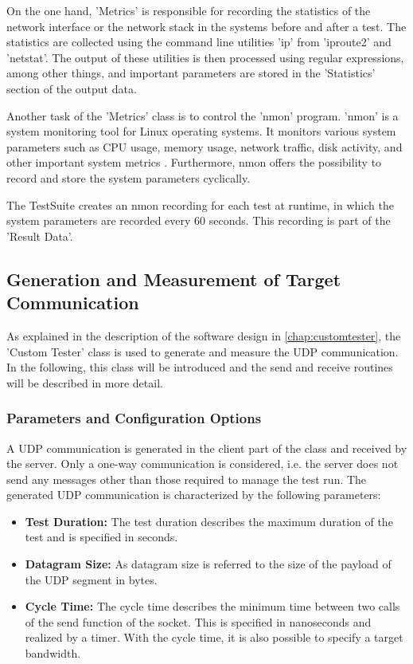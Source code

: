 On the one hand, 'Metrics' is responsible for recording the statistics of the network interface or the network stack in the systems before and after a test. The statistics are collected using the command line utilities 'ip' from 'iproute2' and 'netstat'. The output of these utilities is then processed using regular expressions, among other things, and important parameters are stored in the 'Statistics' section of the output data.

Another task of the 'Metrics' class is to control the 'nmon' program. 'nmon' is a system monitoring tool for Linux operating systems. It monitors various system parameters such as CPU usage, memory usage, network traffic, disk activity, and other important system metrics \cite{tsd04}. Furthermore, nmon offers the possibility to record and store the system parameters cyclically.

The TestSuite creates an nmon recording for each test at runtime, in which the system parameters are recorded every 60 seconds. This recording is part of the 'Result Data'.

\subsection{Generation and Measurement of Target Communication} \label{chap:targetcom}
As explained in the description of the software design in \ref{chap:customtester}, the 'Custom Tester' class is used to generate and measure the UDP communication.  In the following, this class will be introduced and the send and receive routines will be described in more detail.

\subsubsection{Parameters and Configuration Options}
A UDP communication is generated in the client part of the class and received by the server. Only a one-way communication is considered, i.e. the server does not send any messages other than those required to manage the test run. The generated UDP communication is characterized by the following parameters:

\begin{itemize}
	\item \textbf{Test Duration:} The test duration describes the maximum duration of the test and is specified in seconds.
	\item \textbf{Datagram Size:} As datagram size is referred to the size of the payload of the UDP segment in bytes.
	\item \textbf{Cycle Time:} The cycle time describes the minimum time between two calls of the send function of the socket. This is specified in nanoseconds and realized by a timer. With the cycle time, it is also possible to specify a target bandwidth.
\end{itemize}

